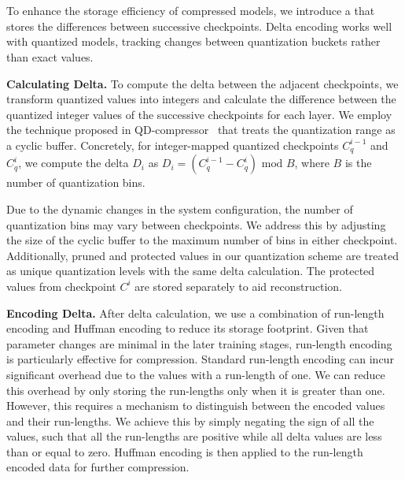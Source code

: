 
\section{\deltaE}
\label{sec:delta}

To enhance the storage efficiency of compressed models, we introduce a \deltaE that stores the differences between successive checkpoints. Delta encoding works well with quantized models, tracking changes between quantization buckets rather than exact values.


\noindent\textbf{Calculating Delta.} To compute the delta between the adjacent checkpoints, we transform quantized values into integers and calculate the difference between the quantized integer values of the successive checkpoints for each layer.
We employ the technique proposed in QD-compressor~\cite{QD} that treats the quantization range as a cyclic buffer. Concretely, for integer-mapped quantized checkpoints $C^{i-1}_q$ and $C^i_q$, we compute the delta $D_i$ as $ D_i = (C^{i-1}_q - C^i_q) \text{ mod } B$, where $B$ is the number of quantization bins. %


Due to the dynamic changes in the system configuration, the number of quantization bins may vary between checkpoints. We address this by adjusting the size of the cyclic buffer to the maximum number of bins in either checkpoint. Additionally, pruned and protected values in our quantization scheme are treated as unique quantization levels with the same delta calculation. The protected values from checkpoint $C^i$ are stored separately to aid reconstruction.


\noindent\textbf{Encoding Delta.}
After delta calculation, we use a combination of run-length encoding \cite{rle} and Huffman \cite{huffman} encoding to reduce its storage footprint. Given that parameter changes are minimal in the later training stages, run-length encoding is particularly effective for compression. Standard run-length encoding can incur significant overhead due to the values with a run-length of one. We can reduce this overhead by only storing the run-lengths only when it is greater than one. However, this requires a mechanism to distinguish between the encoded values and their run-lengths. We achieve this by simply negating the sign of all the values, such that all the run-lengths are positive while all delta values are less than or equal to zero. Huffman encoding is then applied to the run-length encoded data for further compression.




